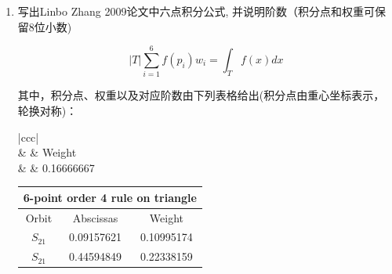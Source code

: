 \documentclass[12pt,a4paper]{article}
\begin{document}
\begin{enumerate}
\begin{proof}
			对任意多项式$\phi\in P_2(K)$,有
			
			$$
			\phi=\sum_{i=1}^3\phi(a_i)\phi_i+\sum_{i=1}^3\phi(m_i)\phi_{i+3}, 
			$$
			
			由积分公式
			$$
			\iint_{K}\lambda_{1}^{m}\lambda_{2}^{n}\lambda_{3}^{k}\mathrm{d}x\mathrm{d}y=2S_K\frac{m!\cdot n!\cdot k!}{(m+n+k+2)!}.
			$$
			
			代入计算可得
			
			$$
			\int_K \phi \mathrm{dx} \approx \frac{S_K}{3} \sum_{i=4}^6 \phi\left(a_i\right)
			$$
		\end{proof}
		\item 写出Linbo Zhang 2009论文中六点积分公式, 并说明阶数（积分点和权重可保留8位小数)
		
		$$
		|T|\sum_{i=1}^6f(p_i)w_i=\int_Tf(x)dx
		$$
		
		其中，积分点、权重以及对应阶数由下列表格给出(积分点由重心坐标表示，轮换对称)：
		
		\begin{table}[h]
			\centering
			\begin{tabular}{|ccc|}
				\hline
				                                                                 \\ \hline
				 &                                                        & Weight     \\ \hline
				  &  & 0.16666667 \\ \hline
			\end{tabular}
		\end{table}
		
		\begin{table}[h]
			\centering
			\begin{tabular}{|ccc|}
				\hline
				\multicolumn{3}{|c|}{\textbf{6-point order 4 rule on triangle}}            \\ \hline
				\multicolumn{1}{|c|}{Orbit} & \multicolumn{1}{c|}{Abscissas}  & Weight     \\ \hline
				\multicolumn{1}{|c|}{$S_{21}$}   & \multicolumn{1}{c|}{0.09157621} & 0.10995174 \\ \hline
				\multicolumn{1}{|c|}{$S_{21}$}   & \multicolumn{1}{c|}{0.44594849} & 0.22338159 \\ \hline
			\end{tabular}
		\end{table}
	\end{enumerate}
	
\end{document}
